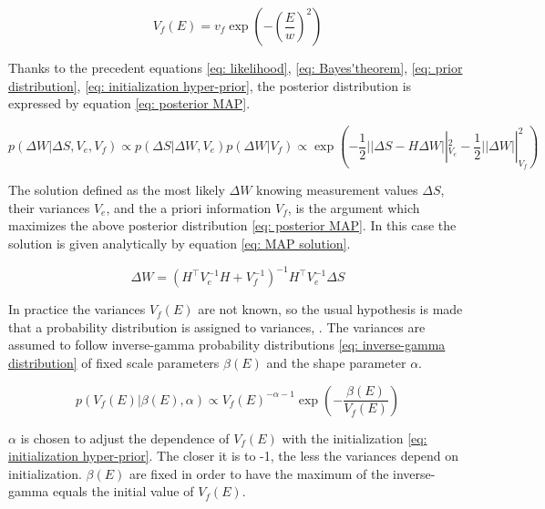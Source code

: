 \begin{equation}
V_{f}\left(E\right) = v_{f}\exp\left(-\left(\frac{E}{w}\right)^{2}\right) \label{eq: initialization hyper-prior}
\end{equation}

Thanks to the precedent equations \eqref{eq: likelihood}, \eqref{eq: Bayes'theorem}, \eqref{eq: prior distribution}, \eqref{eq: initialization hyper-prior}, the posterior distribution is expressed by equation \eqref{eq: posterior MAP}.

\begin{equation}
p\left(\Delta W \left|\right. \Delta S, V_{e}, V_{f} \right) \propto p\left(\Delta S \left|\right. \Delta W, V_{e}\right)p\left(\Delta W \left|\right. V_{f} \right) \propto \exp\left(-\frac{1}{2}\left||\Delta S-H\Delta W\right||^{2}_{V_{e}}-\frac{1}{2}\left||\Delta W\right||^{2}_{V_{f}}\right) \label{eq: posterior MAP}
\end{equation}

The solution defined as the most likely $\Delta W$ knowing measurement values $\Delta S$, their variances $V_{e}$, and the a priori information $V_{f}$, is the argument which maximizes the above posterior distribution \eqref{eq: posterior MAP}.
In this case the solution is given analytically by equation \eqref{eq: MAP solution}.

\begin{equation}
\Delta W = \left(H^{\top}V_{e}^{-1}H+V_{f}^{-1}\right)^{-1}H^{\top}V_{e}^{-1}\Delta S \label{eq: MAP solution}
\end{equation}

In practice the variances $V_{f}\left(E\right)$ are not known, so the usual hypothesis is made that a probability distribution is assigned to variances, \cite{mohammad2015bayesian}.
The variances are assumed to follow inverse-gamma probability distributions \eqref{eq: inverse-gamma distribution} of fixed scale parameters $\beta\left(E\right)$ and the shape parameter $\alpha$.

\begin{equation}
p\left( V_{f}\left(E\right) \left|\right. \beta\left(E\right),\alpha \right) \propto V_{f}\left(E\right)^{-\alpha-1}\exp\left(-\frac{\beta\left(E\right)}{V_{f}\left(E\right)}\right) \label{eq: inverse-gamma distribution}
\end{equation}

$\alpha$ is chosen to adjust the dependence of $V_{f}\left(E\right)$ with the initialization \eqref{eq: initialization hyper-prior}.
The closer it is to -1, the less the variances depend on initialization.
$\beta\left(E\right)$ are fixed in order to have the maximum of the inverse-gamma equals the initial value of $V_{f}\left(E\right)$.


